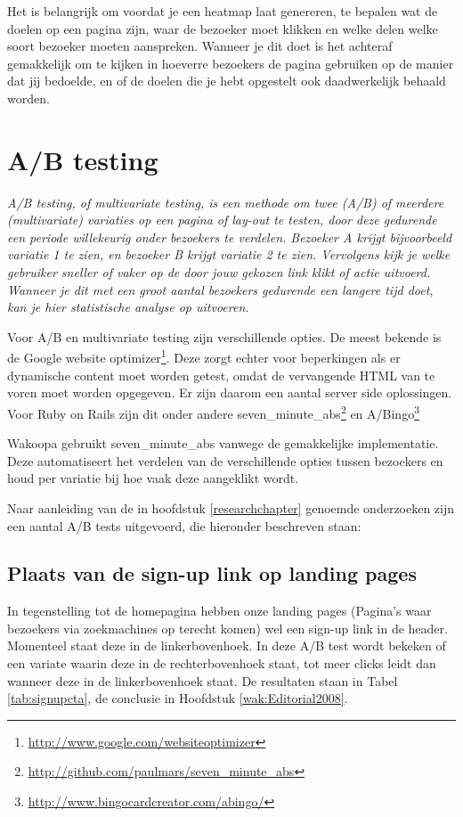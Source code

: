 \documentclass[a4paper, 10pt, pdftex]{report}
\begin{document}
    Het is belangrijk om voordat je een heatmap laat genereren, te bepalen wat de doelen op een pagina zijn, waar de bezoeker moet klikken en welke delen welke soort bezoeker moeten aanspreken. Wanneer je dit doet is het achteraf gemakkelijk om te kijken in hoeverre bezoekers de pagina gebruiken op de manier dat jij bedoelde, en of de doelen die je hebt opgestelt ook daadwerkelijk behaald worden.

    \section{A/B testing}
    \textit{A/B testing, of multivariate testing, is een methode om twee (A/B) of meerdere (multivariate) variaties op een pagina of lay-out te testen, door deze gedurende een periode willekeurig onder bezoekers te verdelen. Bezoeker \emph{A} krijgt bijvoorbeeld variatie 1 te zien, en bezoeker \emph{B} krijgt variatie 2 te zien. Vervolgens kijk je welke gebruiker sneller of vaker op de door jouw gekozen link klikt of actie uitvoerd. Wanneer je dit met een groot aantal bezoekers gedurende een langere tijd doet, kan je hier statistische analyse op uitvoeren.}

    Voor A/B en multivariate testing zijn verschillende opties. De meest bekende is de Google website optimizer\footnote{\url{http://www.google.com/websiteoptimizer}}. Deze zorgt echter voor beperkingen als er dynamische content moet worden getest, omdat de vervangende HTML van te voren moet worden opgegeven. Er zijn daarom een aantal server side oplossingen. Voor Ruby on Rails zijn dit onder andere seven\_minute\_abs\footnote{\url{http://github.com/paulmars/seven\_minute\_abs}} en A/Bingo\footnote{\url{http://www.bingocardcreator.com/abingo/}}

   Wakoopa gebruikt seven\_minute\_abs vanwege de gemakkelijke implementatie. Deze automatiseert het verdelen van de verschillende opties tussen bezoekers en houd per variatie bij hoe vaak deze aangeklikt wordt.

    Naar aanleiding van de in hoofdstuk \ref{researchchapter} genoemde onderzoeken zijn een aantal A/B tests uitgevoerd, die hieronder beschreven staan:

    \subsection{Plaats van de sign-up link op landing pages}
      \label{ctatest}
      In tegenstelling tot de homepagina hebben onze landing pages (Pagina's waar bezoekers via zoekmachines op terecht komen) wel een sign-up link in de header. Momenteel staat deze in de linkerbovenhoek. In deze A/B test wordt bekeken of een variate waarin deze in de rechterbovenhoek staat, tot meer clicks leidt dan wanneer deze in de linkerbovenhoek staat. De resultaten staan in Tabel \ref{tab:signupcta}, de conclusie in Hoofdstuk \ref{wak:Editorial2008}.
\end{document}
